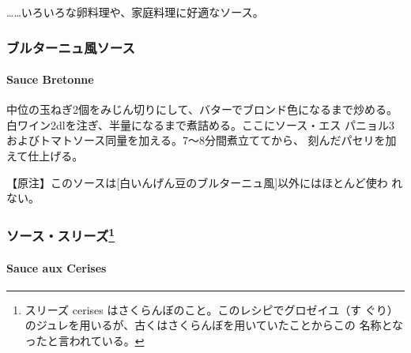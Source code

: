 \begin{recette}
\ldots{}\ldots{}いろいろな卵料理や、家庭料理に好適なソース。

\maeaki

\hypertarget{ux30d6ux30ebux30bfux30fcux30cbux30e5ux98a8ux30bdux30fcux30b9}{%
\subsubsection{ブルターニュ風ソース}\label{ux30d6ux30ebux30bfux30fcux30cbux30e5ux98a8ux30bdux30fcux30b9}}

\hypertarget{sauce-bretonne}{%
\paragraph{Sauce Bretonne}\label{sauce-bretonne}}


中位の玉ねぎ2個をみじん切りにして、バターでブロンド色になるまで炒める。
白ワイン2\undemi{}dlを注ぎ、半量になるまで煮詰める。ここにソース・エス
パニョル3\undemi{}およびトマトソース同量を加える。7〜8分間煮立ててから、
刻んだパセリを加えて仕上げる。

【原注】このソースは{[}白いんげん豆のブルターニュ風{]}以外にはほとんど使わ
れない。

\maeaki

\hypertarget{ux30bdux30fcux30b9ux30b9ux30eaux30fcux30ba6}{%
\subsubsection[ソース・スリーズ]{\texorpdfstring{ソース・スリーズ\footnote{スリーズ
  cerises はさくらんぼのこと。このレシピでグロゼイユ（す
  ぐり）のジュレを用いるが、古くはさくらんぼを用いていたことからこの
  名称となったと言われている。}}{ソース・スリーズ}}\label{ux30bdux30fcux30b9ux30b9ux30eaux30fcux30ba6}}

\hypertarget{sauce-aux-cerises}{%
\paragraph{Sauce aux Cerises}\label{sauce-aux-cerises}}


\end{recette}
